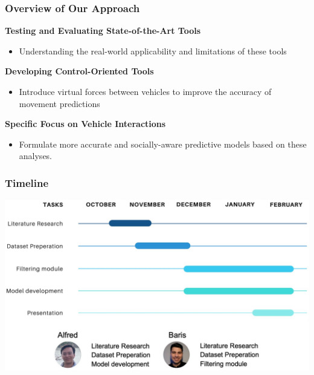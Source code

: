 \begin{frame}
  \frametitle{Overview of Our Approach}

    \textbf{Testing and Evaluating State-of-the-Art Tools}
        \begin{itemize}[]
            \item Understanding the real-world applicability and limitations of these tools
        \end{itemize}

    \textbf{Developing Control-Oriented Tools}
        \begin{itemize}[]
            \item Introduce virtual forces between vehicles to improve the accuracy of movement predictions
        \end{itemize}
    
    \textbf{Specific Focus on Vehicle Interactions}
        \begin{itemize}[]
            \item Formulate more accurate and socially-aware predictive models based on these analyses.
        \end{itemize}


\end{frame}


\begin{frame}
    \frametitle{Timeline}
    \includegraphics[width= 1 \textwidth]{figures/pictures_first_part/timeline.jpeg}
    
\end{frame}

